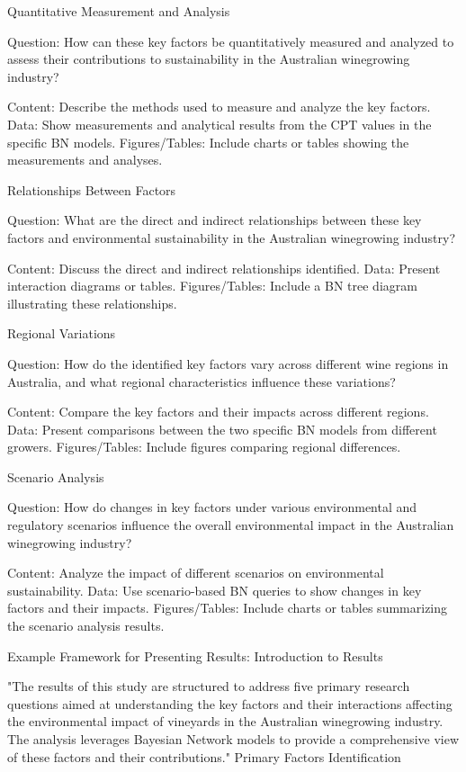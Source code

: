 Quantitative Measurement and Analysis

Question: How can these key factors be quantitatively measured and analyzed to assess their contributions to sustainability in the Australian winegrowing industry?

    Content: Describe the methods used to measure and analyze the key factors.
    Data: Show measurements and analytical results from the CPT values in the specific BN models.
    Figures/Tables: Include charts or tables showing the measurements and analyses.

Relationships Between Factors

Question: What are the direct and indirect relationships between these key factors and environmental sustainability in the Australian winegrowing industry?

    Content: Discuss the direct and indirect relationships identified.
    Data: Present interaction diagrams or tables.
    Figures/Tables: Include a BN tree diagram illustrating these relationships.

Regional Variations

Question: How do the identified key factors vary across different wine regions in Australia, and what regional characteristics influence these variations?

    Content: Compare the key factors and their impacts across different regions.
    Data: Present comparisons between the two specific BN models from different growers.
    Figures/Tables: Include figures comparing regional differences.

Scenario Analysis

Question: How do changes in key factors under various environmental and regulatory scenarios influence the overall environmental impact in the Australian winegrowing industry?

    Content: Analyze the impact of different scenarios on environmental sustainability.
    Data: Use scenario-based BN queries to show changes in key factors and their impacts.
    Figures/Tables: Include charts or tables summarizing the scenario analysis results.

Example Framework for Presenting Results:
Introduction to Results

"The results of this study are structured to address five primary research questions aimed at understanding the key factors and their interactions affecting the environmental impact of vineyards in the Australian winegrowing industry. The analysis leverages Bayesian Network models to provide a comprehensive view of these factors and their contributions."
Primary Factors Identification

